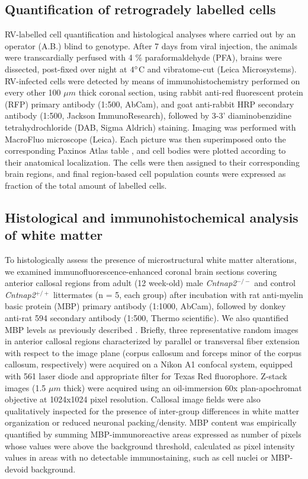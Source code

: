 \subsection{Quantification of retrogradely labelled cells}

RV-labelled cell quantification and histological analyses where carried out by
an operator (A.B.) blind to genotype. After 7 days from viral injection, the
animals were transcardially perfused with 4 \% paraformaldehyde (PFA), brains
were dissected, post-fixed over night at $4\degree$C and vibratome-cut (Leica
Microsystems).  RV-infected cells were detected by means of immunohistochemistry
performed on every other 100 $\mu m$ thick coronal section, using rabbit anti-red
fluorescent protein (RFP) primary antibody (1:500, AbCam), and goat anti-rabbit
HRP secondary antibody (1:500, Jackson ImmunoResearch), followed by 3-3’
diaminobenzidine tetrahydrochloride (DAB, Sigma Aldrich) staining. Imaging was
performed with MacroFluo microscope (Leica). Each picture was then superimposed
onto the corresponding Paxinos Atlas table \parencite{paxinos2004}, and cell
bodies were plotted according to their anatomical localization. The cells were
then assigned to their corresponding brain regions, and final region-based cell
population counts were expressed as fraction of the total amount of labelled
cells.

\subsection{Histological and immunohistochemical analysis of white matter}

To histologically assess the presence of microstructural white matter
alterations, we examined immunofluorescence-enhanced coronal brain sections
covering anterior callosal regions from adult (12 week-old) male \textit{Cntnap2}$^{-/-}$ and
control \textit{Cntnap2}$^{+/+}$ littermates (n = 5, each group) after incubation with rat
anti-myelin basic protein (MBP) primary antibody (1:1000, AbCam), followed by
donkey anti-rat 594 secondary antibody (1:500, Thermo scientific). We also
quantified MBP levels as previously described \parencite{mottershead2003,
richetto2017}.  Briefly, three representative random images in anterior callosal
regions characterized by parallel or transversal fiber extension with respect to
the image plane (corpus callosum and forceps minor of the corpus callosum,
respectively) were acquired on a Nikon A1 confocal system, equipped with 561
laser diode and appropriate filter for Texas Red fluorophore. Z-stack images
(1.5 $\mu m$ thick) were acquired using an oil-immersion 60x plan-apochromat
objective at 1024x1024 pixel resolution. Callosal image fields were also
qualitatively inspected for the presence of inter-group differences in white
matter organization or reduced neuronal packing/density. MBP content was
empirically quantified by summing MBP-immunoreactive areas expressed as number
of pixels whose values were above the background threshold, calculated as pixel
intensity values in areas with no detectable immunostaining, such as cell nuclei
or MBP-devoid background.

